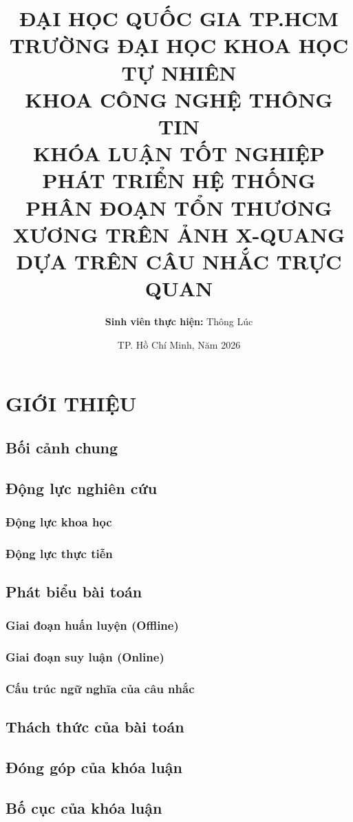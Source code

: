 \documentclass[a4paper,12pt,oneside]{report}
\title{
    \vspace{-2cm}
    \large ĐẠI HỌC QUỐC GIA TP.HCM \\
    TRƯỜNG ĐẠI HỌC KHOA HỌC TỰ NHIÊN \\
    KHOA CÔNG NGHỆ THÔNG TIN \\
    \vspace{3cm}
    \textbf{\huge KHÓA LUẬN TỐT NGHIỆP} \\
    \vspace{1.5cm}
    \textbf{\Large PHÁT TRIỂN HỆ THỐNG PHÂN ĐOẠN TỔN THƯƠNG XƯƠNG TRÊN ẢNH X-QUANG DỰA TRÊN CÂU NHẮC TRỰC QUAN} \\
    \vspace{2cm}
}
\author{\textbf{Sinh viên thực hiện:} Thông Lúc}
\date{\vspace{4cm} TP. Hồ Chí Minh, Năm 2026}
\begin{document}
\chapter{GIỚI THIỆU}
\section{Bối cảnh chung}
\section{Động lực nghiên cứu}
\subsection{Động lực khoa học}
\subsection{Động lực thực tiễn}
\section{Phát biểu bài toán}
\subsection{Giai đoạn huấn luyện (Offline)}
\subsection{Giai đoạn suy luận (Online)}
\subsection{Cấu trúc ngữ nghĩa của câu nhắc}
\section{Thách thức của bài toán}
\section{Đóng góp của khóa luận}
\section{Bố cục của khóa luận}

\end{document}
